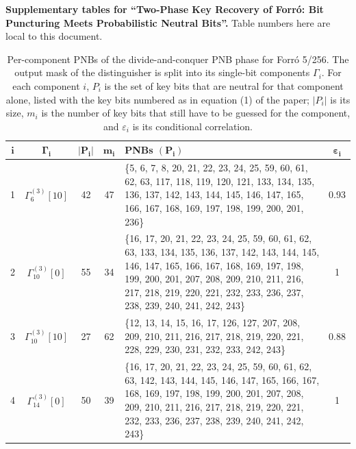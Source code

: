 \documentclass[a4paper]{article}
\newlength{\oprule}\setlength{\oprule}{0.7pt}
\newcommand{\Forro}{Forr\'o\xspace}
\begin{document}
\noindent\textbf{Supplementary tables for ``Two-Phase Key Recovery of \Forro: Bit Puncturing Meets Probabilistic Neutral Bits''.}
Table numbers here are local to this document.
\begin{table}[H]
\centering
\renewcommand{\arraystretch}{1.6}
\setlength{\tabcolsep}{8pt}
\caption{Per-component PNBs of the divide-and-conquer PNB phase for \Forro 5/256. The output mask of the distinguisher is split into its single-bit components $\Gamma_i$. For each component $i$, $P_i$ is the set of key bits that are neutral for that component alone, listed with the key bits numbered as in equation (1) of the paper; $|P_i|$ is its size, $m_i$ is the number of key bits that still have to be guessed for the component, and $\varepsilon_i$ is its conditional correlation.}
\label{app:pnbtab-5}
\begin{tabular}{@{}cccc p{8cm} c@{}}
\toprule
$\boldsymbol{i}$ & $\boldsymbol{\Gamma_i}$ & $\boldsymbol{|P_i|}$ & $\boldsymbol{m_i}$ & \textbf{PNBs $(\boldsymbol{P_i})$} & $\boldsymbol{\varepsilon_i}$ \\
\midrule
1 & $\Gamma^{(3)}_{6}[10]$ & 42 & 47 &
\{5, 6, 7, 8, 20, 21, 22, 23, 24, 25, 59, 60, 61, 62, 63, 117, 118, 119, 120, 121, 133, 134, 135, 136, 137, 142, 143, 144, 145, 146, 147, 165, 166, 167, 168, 169, 197, 198, 199, 200, 201, 236\} & 0.93 \\
\midrule
2 & $\Gamma^{(3)}_{10}[0]$ & 55 & 34 &
\{16, 17, 20, 21, 22, 23, 24, 25, 59, 60, 61, 62, 63, 133, 134, 135, 136, 137, 142, 143, 144, 145, 146, 147, 165, 166, 167, 168, 169, 197, 198, 199, 200, 201, 207, 208, 209, 210, 211, 216, 217, 218, 219, 220, 221, 232, 233, 236, 237, 238, 239, 240, 241, 242, 243\} & 1 \\
\midrule
3 & $\Gamma^{(3)}_{10}[10]$ & 27 & 62 &
\{12, 13, 14, 15, 16, 17, 126, 127, 207, 208, 209, 210, 211, 216, 217, 218, 219, 220, 221, 228, 229, 230, 231, 232, 233, 242, 243\} & 0.88 \\
\midrule
4 & $\Gamma^{(3)}_{14}[0]$ & 50 & 39 &
\{16, 17, 20, 21, 22, 23, 24, 25, 59, 60, 61, 62, 63, 142, 143, 144, 145, 146, 147, 165, 166, 167, 168, 169, 197, 198, 199, 200, 201, 207, 208, 209, 210, 211, 216, 217, 218, 219, 220, 221, 232, 233, 236, 237, 238, 239, 240, 241, 242, 243\} & 1 \\
\bottomrule
\end{tabular}
\end{table}
\end{document}
